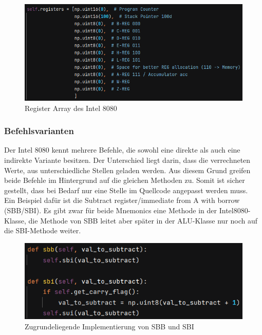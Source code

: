 \documentclass[12pt]{article}
\newcommand{\imgSpaceBefore}{\vspace{10pt}}
\begin{document}
\imgSpaceBefore
\begin{figure}[H]
\centering
\includegraphics[width=15cm]{Bilder/register_array}
\caption{Register Array des Intel 8080}
\label{fig:reg_array}
\end{figure}


\noindent


\subsubsection{Befehlsvarianten}

Der Intel 8080 kennt mehrere Befehle, die sowohl eine direkte als auch eine indirekte Variante besitzen. Der Unterschied liegt darin, dass die verrechneten Werte, aus unterschiedliche Stellen geladen werden. Aus diesem Grund greifen beide Befehle im Hintergrund auf die gleichen Methoden zu. Somit ist sicher gestellt, dass bei Bedarf nur eine Stelle im Quellcode angepasst werden muss.
\\
Ein Beispiel dafür ist die \glqq Subtract register/immediate from A with borrow (SBB/SBI)\grqq. Es gibt zwar für beide Mnemonics eine Methode in der Intel8080-Klasse, die Methode von SBB leitet aber später in der ALU-Klasse nur noch auf die SBI-Methode weiter.

\imgSpaceBefore
\begin{figure}[h]
\centering
\includegraphics[width=15cm]{Bilder/DoubleUsedMethodSubtract}
\caption{Zugrundeliegende Implementierung von SBB und SBI}
\label{fig:DoubleUsedMethodSubtract}
\end{figure}
\end{document}
